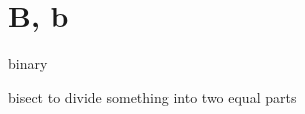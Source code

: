 \section{B, b}

\begin{DefWord}{binary}
\end{DefWord}

\begin{DefWord}{bisect}
    to divide something into two equal parts
\end{DefWord}